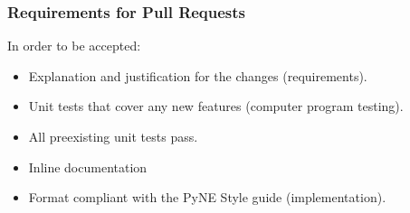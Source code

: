 \documentclass[12pt]{beamer}
\begin{document}
\begin{frame}
\begin{columns}
\begin{column}{0.5\textwidth}
\end{column}
\end{columns}


\end{frame}

\begin{frame}
\frametitle{Requirements for Pull Requests}

In order to be accepted:

\begin{itemize}
\item{Explanation and justification for the changes (\alert{requirements}).}
\item{Unit tests that cover any new features (\alert{computer program testing}).}
\item{All preexisting unit tests pass.}
\item{Inline documentation}
\item{Format compliant with the PyNE Style guide (\alert{implementation}).}
\end{itemize}

\end{frame}
\end{document}
